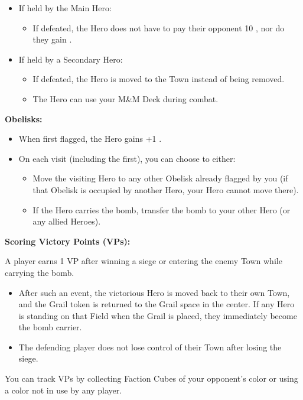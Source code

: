 \begin{multicols}{2}
\begin{itemize}
  \item If held by the Main Hero:
  \begin{itemize}
    \item If defeated, the Hero does not have to pay their opponent 10 , nor do they gain .
  \end{itemize}

  \item If held by a Secondary Hero:
  \begin{itemize}
    \item If defeated, the Hero is moved to the Town instead of being removed.
    \item The Hero can use your M\&M Deck during combat.
  \end{itemize}
\end{itemize}

\textbf{Obelisks:}

\begin{itemize}
  \item When first flagged, the Hero gains +1 .
  \item On each visit (including the first), you can choose to either:
  \begin{itemize}
    \item Move the visiting Hero to any other Obelisk already flagged by you (if that Obelisk is occupied by another Hero, your Hero cannot move there).
    \item If the Hero carries the bomb, transfer the bomb to your other Hero (or any allied Heroes).
  \end{itemize}
\end{itemize}

\textbf{Scoring Victory Points (VPs):}

A player earns 1 VP after winning a siege or entering the enemy Town while carrying the bomb.
\begin{itemize}
  \item After such an event, the victorious Hero is moved back to their own Town, and the Grail token is returned to the Grail space in the center. If any Hero is standing on that Field when the Grail is placed, they immediately become the bomb carrier.
  \item The defending player does not lose control of their Town after losing the siege.
\end{itemize}

You can track VPs by collecting Faction Cubes of your opponent's color or using a color not in use by any player.

\end{multicols}

